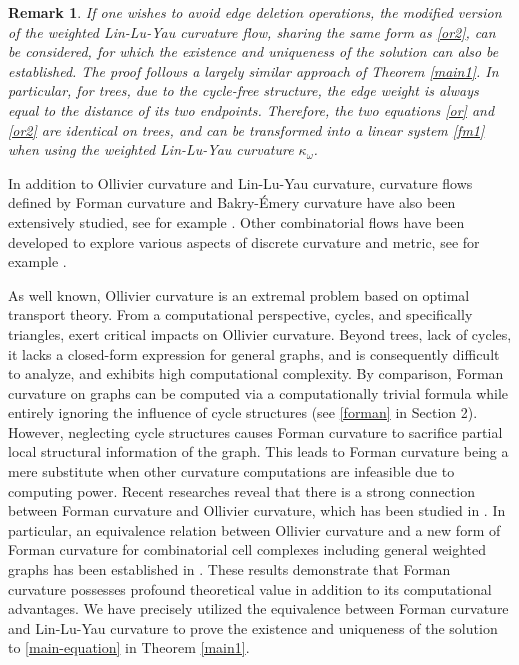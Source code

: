 \documentclass{article}
\newtheorem{remark}{Remark}
\begin{document}
\begin{remark} If one wishes to avoid edge deletion operations, the modified version of the  weighted Lin-Lu-Yau curvature flow, sharing the same form as \eqref{or2}, can be considered, for which the existence and uniqueness of the solution can also be established. The proof follows a largely similar approach of Theorem \ref{main1}. In particular, for trees, due to the cycle-free structure, the edge weight is always equal to the distance of its two endpoints.
    Therefore, the two equations \eqref{or} and \eqref{or2} are identical on trees, and can be transformed into a linear system \eqref{fm1} when using the weighted Lin-Lu-Yau  curvature $\kappa_{\omega}$. 
\end{remark}



In addition to Ollivier curvature and Lin-Lu-Yau curvature, curvature flows defined by Forman curvature and Bakry-Émery curvature have also been extensively studied, see for example \cite{CKLMPS25,HLW24,axioms5040026,10.1093/comnet/cnw030}. Other combinatorial flows have been developed to explore various aspects of discrete curvature and metric, see for example \cite{comflow, CombinatorialCalabiFlows,GLICKENSTEIN2005791}.

As well known, Ollivier curvature is an extremal problem based on optimal transport theory. From a computational perspective, cycles, and specifically triangles, exert critical impacts on Ollivier curvature. Beyond trees, lack of  cycles, it lacks a closed-form expression for general graphs, and is consequently difficult to analyze, and exhibits high computational complexity.
By comparison,  Forman curvature on graphs can be computed via a computationally trivial formula while entirely ignoring the influence of cycle structures (see \eqref{forman} in Section 2). However, neglecting cycle structures causes Forman curvature to sacrifice partial local structural information of the graph. This leads to Forman curvature being a mere substitute when other curvature computations are infeasible due to computing power. 
 Recent researches reveal that there is a strong connection between Forman curvature and Ollivier curvature, which  has been studied in \cite{JM21,BP14,TT21}. In particular, an equivalence relation between Ollivier curvature and a new form of Forman curvature for combinatorial cell complexes including general weighted graphs has been established in \cite{JM21}.
 These results demonstrate that Forman curvature possesses profound theoretical value in addition to its computational advantages. We have precisely utilized the equivalence between Forman curvature and Lin-Lu-Yau curvature to prove the existence and uniqueness of the solution to \eqref{main-equation} in Theorem \ref{main1}.
\end{document}
